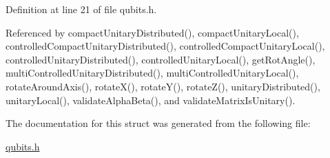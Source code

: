 Definition at line 21 of file qubits.h.

Referenced by compactUnitaryDistributed(), compactUnitaryLocal(), controlledCompactUnitaryDistributed(), controlledCompactUnitaryLocal(), controlledUnitaryDistributed(), controlledUnitaryLocal(), getRotAngle(), multiControlledUnitaryDistributed(), multiControlledUnitaryLocal(), rotateAroundAxis(), rotateX(), rotateY(), rotateZ(), unitaryDistributed(), unitaryLocal(), validateAlphaBeta(), and validateMatrixIsUnitary().

The documentation for this struct was generated from the following file:\begin{DoxyCompactItemize}
\item 
\hyperlink{qubits_8h}{qubits.h}\end{DoxyCompactItemize}
